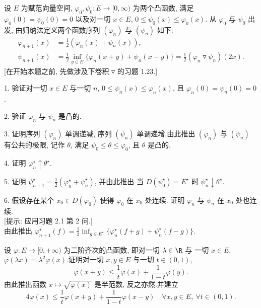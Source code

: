 \begin{problem}
\label{prob:4}
设 $E$ 为赋范向量空间, $\varphi_0,\psi_0:E\to[0,\infty)$ 为两个凸函数, 满足
$\varphi_0(0)=\psi_0(0)=0$ 以及对一切 $x\in E$, $0\le\psi_0(x)\le\varphi_0(x)$.
从 $\varphi_0$ 与 $\psi_0$ 出发, 由归纳法定义两个函数序列 $(\varphi_n)$ 与
$(\psi_n)$ 如下:
\begin{align*}
\varphi_{n+1}(x)&=\frac12(\varphi_n(x)+\psi_n(x)),\\
\psi_{n+1}(x)&=\frac12\inf_{y\in E}\{\varphi_n(x+y)+\psi_n(x-y)\}
=\frac12(\varphi_n\mathbin{\triangledown}\psi_n)(2x).
\end{align*}
[在开始本题之前, 先做涉及下卷积 $\triangledown$ 的习题 1.23.]


1. 验证对一切 $x\in E$ 与一切 $n$, $0\le\psi_n(x)\le\varphi_n(x)$, 且
$\varphi_n(0)=\psi_n(0)=0$.

2. 验证 $\varphi_n$ 与 $\psi_n$ 是凸的.

3. 证明序列 $(\varphi_n)$ 单调递减, 序列 $(\psi_n)$ 单调递增.由此推出
$(\varphi_n)$ 与 $(\psi_n)$ 有公共的极限, 记作 $\theta$, 满足
$\psi_0\le\theta\le\varphi_0$, 且 $\theta$ 是凸的.

4. 证明 $\varphi_n^\star\uparrow\theta^\star$.

5. 证明 $\psi_{n+1}^\star=\frac12(\varphi_n^\star+\psi_n^\star)$, 并由此推出
当 $D(\psi_0^\star)=E^\star$ 时 $\psi_n^\star\downarrow\theta^\star$.

6. 假设存在某个 $x_0\in D(\varphi_0)$ 使得 $\varphi_0$ 在 $x_0$ 处连续.
证明 $\varphi_n$ 与 $\psi_n$ 在 $x_0$ 处也连续.\\
{[提示: 应用习题 2.1 第 2 问.]}\\
由此推出 $\varphi_{n+1}^\star(f)=\frac12\inf_{g\in E^\star}\{\varphi_n^\star(f+g)+\psi_n^\star(f-g)\}$.


设 $\varphi:E\to[0,+\infty)$ 为二阶齐次的凸函数, 即对一切 $\lambda\in\R$ 与
一切 $x\in E$, $\varphi(\lambda x)=\lambda^2\varphi(x)$.证明对一切
$x,y\in E$ 与一切 $t\in(0,1)$,
\begin{equation*}
\varphi(x+y)\le\frac1t\varphi(x)+\frac{1}{1-t}\varphi(y).
\end{equation*}
由此推出函数 $x\mapsto\sqrt{\varphi(x)}$ 是半范数, 反之亦然.并建立
\begin{equation}
4\varphi(x)\le\frac1t\varphi(x+y)+\frac{1}{1-t}\varphi(x-y)
\quad\forall x,y\in E,\ \forall t\in(0,1).
\label{eq:prob4.1}
\end{equation}


\end{problem}
